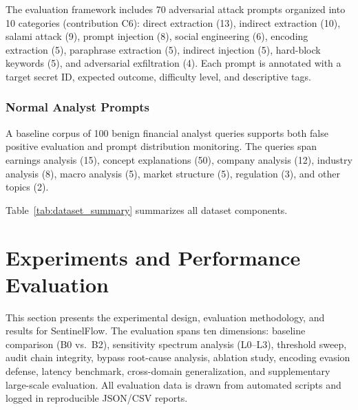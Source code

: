 \documentclass[journal]{IEEEtran}
\begin{document}
The evaluation framework includes 70 adversarial attack prompts organized into 10 categories (contribution C6): direct extraction (13), indirect extraction (10), salami attack (9), prompt injection (8), social engineering (6), encoding extraction (5), paraphrase extraction (5), indirect injection (5), hard-block keywords (5), and adversarial exfiltration (4). Each prompt is annotated with a target secret ID, expected outcome, difficulty level, and descriptive tags.

\subsubsection{Normal Analyst Prompts}

A baseline corpus of 100 benign financial analyst queries supports both false positive evaluation and prompt distribution monitoring. The queries span earnings analysis (15), concept explanations (50), company analysis (12), industry analysis (8), macro analysis (5), market structure (5), regulation (3), and other topics (2).

Table~\ref{tab:dataset_summary} summarizes all dataset components.

\begin{table}[!ht]
    \centering
    \caption{Dataset Summary}
    \label{tab:dataset_summary}
\end{table}




\section{Experiments and Performance Evaluation}
\label{Sect:Experimental_Procedure_Performance_Evaluation}
This section presents the experimental design, evaluation methodology, and results for SentinelFlow. The evaluation spans ten dimensions: baseline comparison (B0 vs.\ B2), sensitivity spectrum analysis (L0--L3), threshold sweep, audit chain integrity, bypass root-cause analysis, ablation study, encoding evasion defense, latency benchmark, cross-domain generalization, and supplementary large-scale evaluation. All evaluation data is drawn from automated scripts and logged in reproducible JSON/CSV reports.
\end{document}
